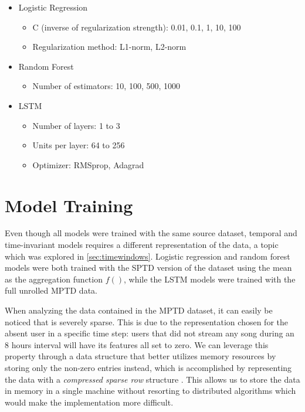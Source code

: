 \documentclass{kththesis}
\begin{document}
\begin{itemize}
\item Logistic Regression
\begin{itemize}
\item C (inverse of regularization strength): 0.01, 0.1, 1, 10, 100
\item Regularization method: L1-norm, L2-norm
\end{itemize}
\item Random Forest
\begin{itemize}
\item Number of estimators: 10, 100, 500, 1000
\end{itemize}
\item LSTM
\begin{itemize}
\item Number of layers: 1 to 3
\item Units per layer: 64 to 256
\item Optimizer: RMSprop, Adagrad
\end{itemize}
\end{itemize}

\section{Model Training}

Even though all models were trained with the same source dataset, temporal and time-invariant models requires a different representation of the data, a topic which was explored in \autoref{sec:timewindows}. Logistic regression and random forest models were both trained with the SPTD version of the dataset using the mean as the aggregation function $f()$, while the LSTM models were trained with the full unrolled MPTD data.

When analyzing the data contained in the MPTD dataset, it can easily be noticed that is severely sparse. This is due to the representation chosen for the absent user in a specific time step: users that did not stream any song during an 8 hours interval will have its features all set to zero. We can leverage this property through a data structure that better utilizes memory resources by storing only the non-zero entries instead, which is accomplished by representing the data with a \emph{compressed sparse row} structure \citep{bulucc2009parallel}. This allows us to store the data in memory in a single machine without resorting to distributed algorithms which would make the implementation more difficult.
\end{document}
